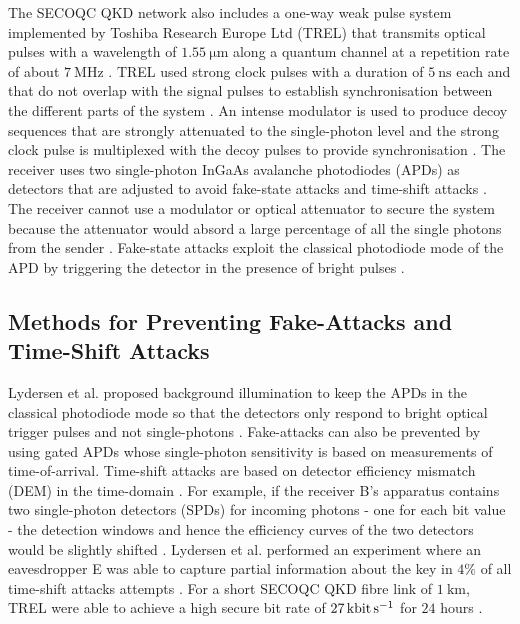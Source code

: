 The SECOQC QKD network also includes a one-way weak pulse system implemented by Toshiba Research Europe Ltd (TREL) that transmits optical pulses with a wavelength of $\SI{1.55}{\micro\meter}$ along a quantum channel at a repetition rate of about $\SI{7}{\mega\hertz}$ \cite{peev2009secoqc}. TREL used strong clock pulses with a duration of $\SI{5}{\nano\second}$ each and that do not overlap with the signal pulses to establish synchronisation between the different parts of the system \cite{peev2009secoqc}. An intense modulator is used to produce decoy sequences that are strongly attenuated to the single-photon level and the strong clock pulse is multiplexed with the decoy pulses to provide synchronisation \cite{peev2009secoqc}. The receiver uses two single-photon InGaAs avalanche photodiodes (APDs) as detectors that are adjusted to avoid fake-state attacks and time-shift attacks \cite{peev2009secoqc}. The receiver cannot use a modulator or optical attenuator to secure the system because the attenuator would absord a large percentage of all the single photons from the sender \cite{lydersen2011secure}. Fake-state attacks exploit the classical photodiode mode of the APD by triggering the detector in the presence of bright pulses \cite{lydersen2011secure}. 

\subsection{Methods for Preventing Fake-Attacks and Time-Shift Attacks}

Lydersen et al. proposed background illumination to keep the APDs in the classical photodiode mode so that the detectors only respond to bright optical trigger pulses and not single-photons \cite{lydersen2011secure}. Fake-attacks can also be prevented by using gated APDs whose single-photon sensitivity is based on measurements of time-of-arrival. Time-shift attacks are based on detector efficiency mismatch (DEM) in the time-domain \cite{lydersen2011secure}. For example, if the receiver B's apparatus contains two single-photon detectors (SPDs) for incoming photons - one for each bit value - the detection windows and hence the efficiency curves of the two detectors would be slightly shifted \cite{lydersen2011secure}. Lydersen et al. performed an experiment where an eavesdropper E was able to capture partial information about the key in $4\%$ of all time-shift attacks attempts \cite{lydersen2011secure}. For a short SECOQC QKD fibre link of $\SI{1}{\kilo\meter}$, TREL were able to achieve a high secure bit rate of $\SI{27}{\kilo\bit\per\second}$ for $24$ hours \cite{peev2009secoqc}. 

